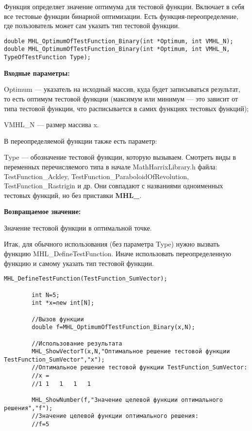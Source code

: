 \documentclass[a4paper,12pt]{article}
\begin{document}
Функция определяет значение оптимума для тестовой функции. Включает в себя все тестовые функции бинарной оптимизации. Есть функция-переопределение, где пользователь может сам указать тип тестовой функции.


\begin{lstlisting}[label=code_syntax_MHL_OptimumOfTestFunction_Binary,caption=Синтаксис]
double MHL_OptimumOfTestFunction_Binary(int *Optimum, int VMHL_N);
double MHL_OptimumOfTestFunction_Binary(int *Optimum, int VMHL_N, TypeOfTestFunction Type);
\end{lstlisting}

\textbf{Входные параметры:}

Optimum --- указатель на исходный массив, куда будет записываться результат, то есть оптимум тестовой функции (максимум или минимум --- это зависит от типа тестовой функции, что расписывается в самих функциях тестовых функций);

     VMHL\_N --- размер массива x.

В переопределяемой функции также есть параметр:
  
Type --- обозначение тестовой функции, которую вызываем.
Смотреть виды в переменных перечисляемого типа в начале MathHarrixLibrary.h файла: TestFunction\_Ackley, TestFunction\_ParaboloidOfRevolution, TestFunction\_Rastrigin и др. Они совпадают с названиями одноименных тестовых функций, но без приставки \textbf{MHL\_}.

\textbf{Возвращаемое значение:}
 
Значение тестовой функции в оптимальной точке.

Итак, для обычного использования (без параметра Type) нужно вызвать функцию MHL\_DefineTestFunction. Иначе использовать переопределенную функцию и самому указать тип тестовой функции.


\begin{lstlisting}[label=code_use_MHL_OptimumOfTestFunction_Binary,caption=Пример использования]
        MHL_DefineTestFunction(TestFunction_SumVector);

        int N=5;
        int *x=new int[N];

        //Вызов функции
        double f=MHL_OptimumOfTestFunction_Binary(x,N);

        //Использование результата
        MHL_ShowVectorT(x,N,"Оптимальное решение тестовой функции TestFunction_SumVector","x");
        //Оптимальное решение тестовой функции TestFunction_SumVector:
        //x =	
        //1	1	1	1	1

        MHL_ShowNumber(f,"Значение целевой функции оптимального решения","f");
        //Значение целевой функции оптимального решения:
        //f=5
\end{lstlisting}
\end{document}
